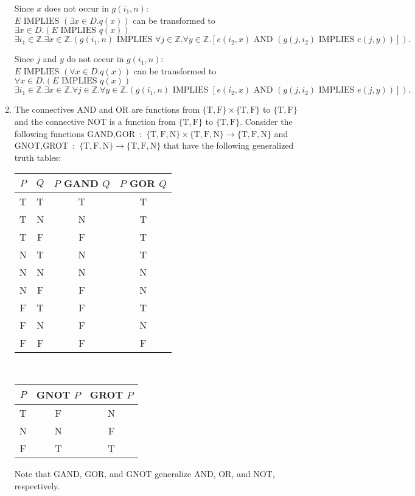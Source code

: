 \documentclass[11pt]{article}
\def\ints {{\mathbb Z}}
\newcommand{\Implies}{\mbox{ IMPLIES }}
\newcommand{\And}{\mbox{ AND }}
\newcommand{\True}{\mbox{T}}
\newcommand{\False}{\mbox{F}}
\newcommand{\Neither}{\mbox{N}}
\begin{document}
\begin{enumerate}
\begin{solution}
Since $x$ does not occur in $g(i_1,n)$:\\
$E\Implies (\exists x\in D.q(x))$ can be transformed to $\exists x\in D.(E\Implies q(x))$
$$\exists i_1 \in \ints.\exists x\in \ints.(g(i_1,n) \Implies \forall j \in \ints.\forall y\in \ints.\left[e(i_2,x)  \And
 (g(j,i_2) \Implies  e(j,y))
\right]).$$

Since $j$ and $y$ do not occur in $g(i_1,n)$:\\
$E\Implies (\forall x\in D.q(x))$ can be transformed to $\forall x\in D.(E\Implies q(x))$
$$\exists i_1 \in \ints.\exists x\in \ints.\forall j \in \ints.\forall y\in \ints.(g(i_1,n) \Implies \left[e(i_2,x)  \And
 (g(j,i_2) \Implies  e(j,y))
\right]).$$

\end{solution}
\item
\begin{question}
The connectives AND and OR are functions from $\{\True,\False\} \times \{\True,\False\}$ to $\{\True,\False\}$
and the connective NOT is a function from $\{\True,\False\}$ to $\{\True,\False\}$.
Consider the following functions
GAND,GOR\ :\ $\{ \True,\False,\Neither\} \times \{ \True,\False,\Neither\} \rightarrow \{ \True,\False,\Neither\}$ and \\
GNOT,GROT\ :\ $\{ \True,\False,\Neither\}  \rightarrow \{ \True,\False,\Neither\}$
that have the following generalized truth tables:
\begin{center}
\begin{tabular}{cccc}
$P$ & $Q$ & $P$ GAND $Q$ & $P$ GOR $Q$\\
\hline
T & T & T & T\\
T & N & N & T\\
T & F & F & T\\
N & T & N & T\\
N & N & N & N\\
N & F & F & N\\
F & T & F & T\\
F & N & F & N\\
F & F & F & F
\end{tabular}
\ \ \ \ \ \ \begin{tabular}{ccc}
$P$ &  GNOT $P$ & GROT $P$\\
\hline
T & F & N\\
N & N & F\\
F & T & T
\end{tabular}
\end{center}
Note that GAND, GOR, and GNOT generalize  AND, OR, and NOT, respectively.

\end{question}
\end{enumerate}
\end{document}
